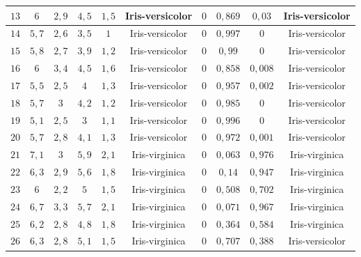 \begin{table}[H]
{\begin{tabular}{|c|c|c|c|c|c|c|c|c|c|}
        $13$ & $6$     & $2{,}9$ & $4{,}5$ & $1{,}5$ & Iris-versicolor  & $0$ & $0{,}869$ & $0{,}03$  & \cellcolor{green!20}Iris-versicolor \\ \hline
        $14$ & $5{,}7$ & $2{,}6$ & $3{,}5$ & $1$     & Iris-versicolor  & $0$ & $0{,}997$ & $0$       & \cellcolor{green!20}Iris-versicolor \\ \hline
        $15$ & $5{,}8$ & $2{,}7$ & $3{,}9$ & $1{,}2$ & Iris-versicolor  & $0$ & $0{,}99$  & $0$       & \cellcolor{green!20}Iris-versicolor \\ \hline
        $16$ & $6$     & $3{,}4$ & $4{,}5$ & $1{,}6$ & Iris-versicolor  & $0$ & $0{,}858$ & $0{,}008$ & \cellcolor{green!20}Iris-versicolor \\ \hline
        $17$ & $5{,}5$ & $2{,}5$ & $4$     & $1{,}3$ & Iris-versicolor  & $0$ & $0{,}957$ & $0{,}002$ & \cellcolor{green!20}Iris-versicolor \\ \hline
        $18$ & $5{,}7$ & $3$     & $4{,}2$ & $1{,}2$ & Iris-versicolor  & $0$ & $0{,}985$ & $0$       & \cellcolor{green!20}Iris-versicolor \\ \hline
        $19$ & $5{,}1$ & $2{,}5$ & $3$     & $1{,}1$ & Iris-versicolor  & $0$ & $0{,}996$ & $0$       & \cellcolor{green!20}Iris-versicolor \\ \hline
        $20$ & $5{,}7$ & $2{,}8$ & $4{,}1$ & $1{,}3$ & Iris-versicolor  & $0$ & $0{,}972$ & $0{,}001$ & \cellcolor{green!20}Iris-versicolor \\ \hline
        $21$ & $7{,}1$ & $3$     & $5{,}9$ & $2{,}1$ & Iris-virginica   & $0$ & $0{,}063$ & $0{,}976$ & \cellcolor{green!20}Iris-virginica \\ \hline
        $22$ & $6{,}3$ & $2{,}9$ & $5{,}6$ & $1{,}8$ & Iris-virginica   & $0$ & $0{,}14$  & $0{,}947$ & \cellcolor{green!20}Iris-virginica \\ \hline
        $23$ & $6$     & $2{,}2$ & $5$     & $1{,}5$ & Iris-virginica   & $0$ & $0{,}508$ & $0{,}702$ & \cellcolor{green!20}Iris-virginica \\ \hline
        $24$ & $6{,}7$ & $3{,}3$ & $5{,}7$ & $2{,}1$ & Iris-virginica   & $0$ & $0{,}071$ & $0{,}967$ & \cellcolor{green!20}Iris-virginica \\ \hline
        $25$ & $6{,}2$ & $2{,}8$ & $4{,}8$ & $1{,}8$ & Iris-virginica   & $0$ & $0{,}364$ & $0{,}584$ & \cellcolor{green!20}Iris-virginica \\ \hline
        $26$ & $6{,}3$ & $2{,}8$ & $5{,}1$ & $1{,}5$ & Iris-virginica   & $0$ & $0{,}707$ & $0{,}388$ & \cellcolor{red!20}Iris-versicolor \\ \hline

\end{tabular}}
\end{table}
